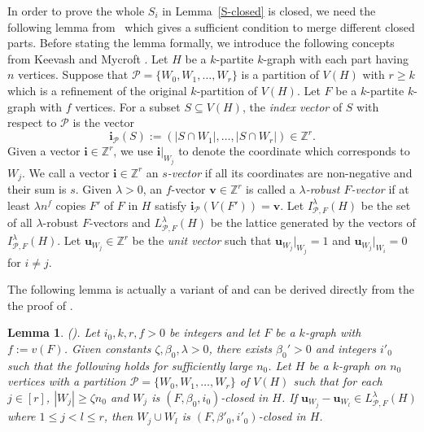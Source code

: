 \documentclass[11pt,a4paper]{article}
\newtheorem{lemma}[thm]{Lemma}
\theoremstyle{definition}
\begin{document}
In order to prove the whole $S_i$ in Lemma~\ref{S-closed} is closed, we need the following lemma from~\cite{Han2017Minimum} which gives a sufficient condition to merge different closed parts. Before stating the lemma formally, we introduce the following concepts from Keevash and Mycroft \cite{Ke2015}.  Let $H$ be a $k$-partite $k$-graph with each part having $n$ vertices. Suppose that $\mathcal{P} =\{W_0,W_1,\dots,W_r\}$ is a partition of $V (H)$ with $r\geq k$ which is a refinement of the original $k$-partition of $V(H)$. Let $F$ be a $k$-partite $k$-graph with $f$ vertices. For a subset $S\subseteq V(H)$, the \textit{index vector} of $S$ with respect to $\mathcal{P}$ is the vector 
$$\mathbf{i}_{\mathcal{P}}(S):=(|S\cap W_1|,\dots ,|S\cap W_r|)\in \mathbb{Z}^r.$$
Given a vector $\mathbf{i}\in \mathbb{Z}^r$, we use $\mathbf{i}|_{W_j}$ to denote the coordinate which corresponds to $W_j$. We call a vector $\mathbf{i}\in \mathbb{Z}^r$ an \emph{$s$-vector} if all its coordinates are non-negative and their sum is $s$. Given $\lambda>0$, an $f$-vector $\mathbf{v} \in \mathbb{Z}^r$ is called a \emph{$\lambda$-robust $F$-vector} if at least $\lambda n^f$ copies $F'$ of $F$ in $H$ satisfy $\mathbf{i}_{\mathcal{P}}(V(F'))=\mathbf{v}$. Let $I^{\lambda}_{\mathcal{P},F}(H)$ be the set of all $\lambda$-robust $F$-vectors and $L^{\lambda}_{\mathcal{P},F}(H)$ be the lattice generated by the vectors of $I^{\lambda}_{\mathcal{P},F}(H)$. Let $\mathbf{u}_{W_j}\in \mathbb{Z}^r$ be the {\emph{unit vector}} such that $\mathbf{u}_{W_j}|_{W_j}=1$ and $\mathbf{u}_{W_j}|_{W_i}=0$ for $i\ne j$. 

The following lemma is actually a variant of \cite[\rm Lemma 3.9]{Han2017Minimum} and can be derived directly from the the proof of \cite[\rm Lemma 3.9]{Han2017Minimum}.

\begin{lemma}{\rm{(}\cite[\rm Lemma 3.9]{Han2017Minimum}\rm{)}.}
\label{V-closed}
Let $i_0, k, r,f> 0$ be integers and let $F$ be a $k$-graph with $f:=v(F)$. Given constants $\zeta, \beta_0 , \lambda > 0$, there exists $\beta_0'>0$ and integers $i'_0$ such that the following holds for sufficiently large $n_0$. Let $H$ be a $k$-graph on $n_0$ vertices with a partition $\mathcal{P} =\{W_0,W_1,\dots,W_r\}$ of $V (H)$ such that for each $j\in [r]$, $|W_j|\geq \zeta n_0$ and $W_j$ is $(F,\beta_0 , i_0)$-closed in $H$. If $\mathbf{u}_{W_j} -\mathbf{u}_{W_l} \in  L^{\lambda}_{\mathcal{P},F}(H)$ where $1 \leq  j <l \leq r$, then $W_j\cup W_l$ is $(F, \beta'_0, i'_0)$-closed in $H$. 
\end{lemma}
\end{document}
